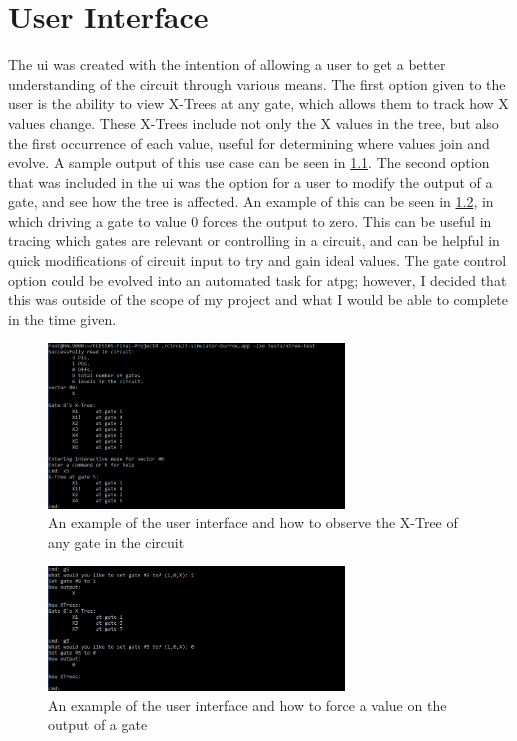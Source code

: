 \documentclass[12pt]{report}
\begin{document}
\singlespacing
\chapter{User Interface}\label{sec:ui}
\doublespacing

The \ac{ui} was created with the intention of allowing a user to get a better understanding of the circuit through various means. The first option given to the user is the ability to view X-Trees at any gate, which allows them to track how X values change. These X-Trees include not only the X values in the tree, but also the first occurrence of each value, useful for determining where values join and evolve. A sample output of this use case can be seen in \cref{fig:sim-xtree-cmd}. The second option that was included in the \ac{ui} was the option for a user to modify the output of a gate, and see how the tree is affected. An example of this can be seen in \cref{fig:sim-gate-cmd}, in which driving a gate to value 0 forces the output to zero. This can be useful in tracing which gates are relevant or controlling in a circuit, and can be helpful in quick modifications of circuit input to try and gain ideal values. The gate control option could be evolved into an automated task for \ac{atpg}; however, I decided that this was outside of the scope of my project and what I would be able to complete in the time given.

\begin{figure}[h]
	\centering
	\includegraphics[width=0.7\textwidth]{sim-xtree-cmd.png}
	\caption[UI X-Tree Viewer]{An example of the user interface and how to observe the X-Tree of any gate in the circuit}
	\label{fig:sim-xtree-cmd}
\end{figure}

\begin{figure}[h]
	\centering
	\includegraphics[width=0.7\textwidth]{sim-gate-cmd.png}
	\caption[UI Gate Controller]{An example of the user interface and how to force a value on the output of a gate}
	\label{fig:sim-gate-cmd}
\end{figure}




\appendix

\end{document}
